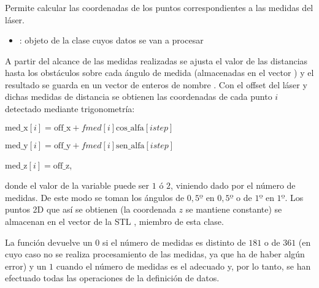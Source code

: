 \subsubsection {}


\noindent
Permite calcular las coordenadas de los puntos correspondientes a las medidas del láser.

\begin{itemize}
  \item {}: objeto de la clase  cuyos datos se van a procesar
\end{itemize}

\noindent
A partir del alcance de las medidas realizadas se ajusta el valor de las distancias hasta los obstáculos sobre cada ángulo de medida (almacenadas en el vector ) y el resultado se guarda en un vector de enteros de nombre .
\noindent
Con el offset del láser y dichas medidas de distancia se obtienen las coordenadas de cada punto $i$ detectado mediante trigonometría:

$\mbox{med\_x}[i] = \mbox{off\_x}+fmed[i]\mbox{cos\_alfa}[istep]$

$\mbox{med\_y}[i] = \mbox{off\_y}+fmed[i]\mbox{sen\_alfa}[istep]$

$\mbox{med\_z}[i] = \mbox{off\_z}$,

\noindent
donde el valor de la variable  puede ser $1$ ó $2$, viniendo dado por el número de medidas. De este modo se toman los ángulos de $0,5º$ en $0,5º$ o de $1º$ en $1º$.
\noindent
Los puntos 2D que así se obtienen (la coordenada $z$ se mantiene constante) se almacenan en el vector de la STL , miembro de esta clase.

La función devuelve un $0$ si el número de medidas es distinto de $181$ o de $361$ (en cuyo caso no se realiza procesamiento de las medidas, ya que ha de haber algún error) y un $1$ cuando el número de medidas es el adecuado y, por lo tanto, se han efectuado todas las operaciones de la definición de datos.

%
%
%
%

